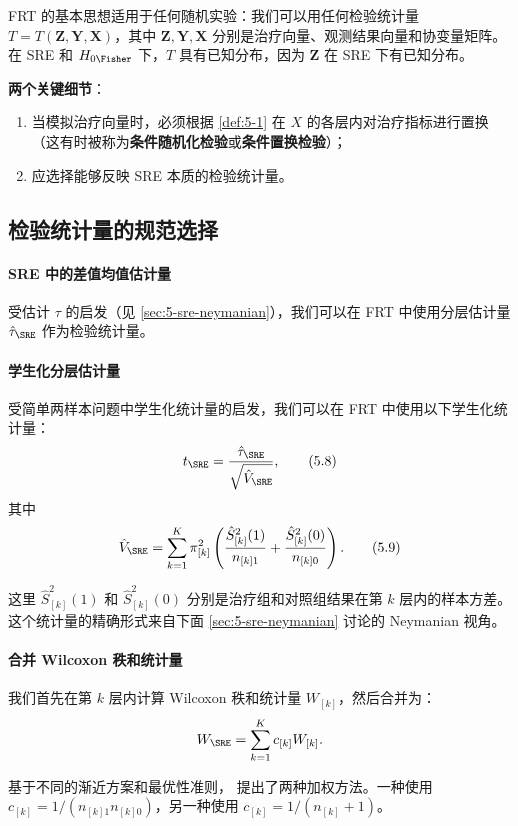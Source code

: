 FRT 的基本思想适用于任何随机实验：我们可以用任何检验统计量 $T = T(\mathbf{Z}, \mathbf{Y}, \mathbf{X})$，其中 $\mathbf{Z}, \mathbf{Y}, \mathbf{X}$ 分别是治疗向量、观测结果向量和协变量矩阵。在 SRE 和 $H_{0\Fisher}$ 下，$T$ 具有已知分布，因为 $\mathbf{Z}$ 在 SRE 下有已知分布。

\textbf{两个关键细节}：
\begin{enumerate}
  \item 当模拟治疗向量时，必须根据 \cref{def:5-1} 在 $X$ 的各层内对治疗指标进行置换（这有时被称为\textbf{条件随机化检验}或\textbf{条件置换检验}）；
  \item 应选择能够反映 SRE 本质的检验统计量。
\end{enumerate}

\subsection{检验统计量的规范选择}

\paragraph{SRE 中的差值均值估计量}

受估计 $\tau$ 的启发（见 \cref{sec:5-sre-neymanian}），我们可以在 FRT 中使用分层估计量 $\hat\tau_\SRE$ 作为检验统计量。

\paragraph{学生化分层估计量}

受简单两样本问题中学生化统计量的启发，我们可以在 FRT 中使用以下学生化统计量：
\[
t_\SRE = \frac{\hat\tau_\SRE}{\sqrt{\hat V_\SRE}},
\tag{5.8}
\]
其中
\[
\hat V_\SRE = \sum_{k=1}^K \pi_{[k]}^2 \left( \frac{\hat S_{[k]}^2(1)}{n_{[k]1}} + \frac{\hat S_{[k]}^2(0)}{n_{[k]0}} \right).
\tag{5.9}
\]

这里 $\hat S_{[k]}^2(1)$ 和 $\hat S_{[k]}^2(0)$ 分别是治疗组和对照组结果在第 $k$ 层内的样本方差。这个统计量的精确形式来自下面 \cref{sec:5-sre-neymanian} 讨论的 Neymanian 视角。

\paragraph{合并 Wilcoxon 秩和统计量}

我们首先在第 $k$ 层内计算 Wilcoxon 秩和统计量 $W_{[k]}$，然后合并为：
\[
W_\SRE = \sum_{k=1}^K c_{[k]} W_{[k]}.
\]

基于不同的渐近方案和最优性准则，\citet{VanElteren:1960} 提出了两种加权方法。一种使用 $c_{[k]} = 1 / (n_{[k]1} n_{[k]0})$，另一种使用 $c_{[k]} = 1 / (n_{[k]} + 1)$。

